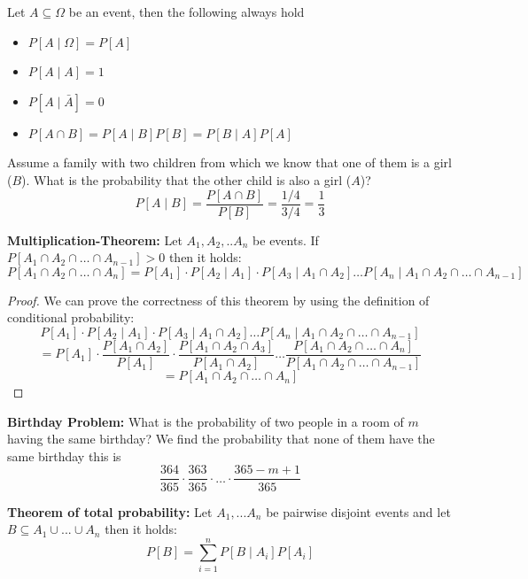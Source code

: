 \begin{remark}
    Let $A \subseteq \Omega$ be an event, then the following always hold
    \begin{itemize}
        \item $P[A \mid \Omega] = P[A]$
        \item $P[A \mid A] = 1$
        \item $P[A \mid \bar{A}] = 0$
        \item $P[A \cap B] = P[A \mid B] P[B] = P[B \mid A] P[A]$
    \end{itemize}
\end{remark}

\begin{example}
    Assume a family with two children from which we know that one of them is a girl ($B$). What is the probability that the other child is also a girl ($A$)?
    $$P[A \mid B] = \frac{P[A \cap B]}{P[B]} = \frac{1/4}{3/4} = \frac{1}{3}$$
\end{example}

\begin{theorem}
    \textbf{Multiplication-Theorem: } Let $A_1, A_2, .. A_n$ be events. If $P[A_1 \cap A_2 \cap \dots \cap A_{n-1}] > 0$ then it holds:
    $$P[A_1 \cap A_2 \cap \dots \cap A_n] = P[A_1] \cdot P[A_2 \mid A_1] \cdot P[A_3 \mid A_1 \cap A_2] \dots P[A_n \mid A_1 \cap A_2 \cap \dots \cap A_{n-1}]$$
    
\end{theorem}

\begin{proof}
    We can prove the correctness of this theorem by using the definition of conditional probability:
    $$P[A_1] \cdot P[A_2 \mid A_1] \cdot P[A_3 \mid A_1 \cap A_2] \dots P[A_n \mid A_1 \cap A_2 \cap \dots \cap A_{n-1}]$$
    $$ = P[A_1] \cdot \frac{P[A_1 \cap A_2]}{P[A_1]} \cdot \frac{P[A_1 \cap A_2 \cap A_3]}{P[A_1 \cap A_2]} \dots \frac{P[A_1 \cap A_2 \cap \dots \cap A_n]}{P[A_1 \cap A_2 \cap \dots \cap A_{n-1}]}$$
    $$ = P[A_1 \cap A_2 \cap \dots \cap A_n]$$
\end{proof}

\begin{example}
    \textbf{Birthday Problem: } What is the probability of two people in a room of $m$ having the same birthday? We find the probability that none of them have the same birthday this is 
    $$\frac{364}{365} \cdot \frac{363}{365} \cdot \dots \cdot \frac{365-m+1}{365}$$
\end{example}

\begin{theorem}
    \textbf{Theorem of total probability: }Let $A_1, ... A_n$ be pairwise disjoint events and let $B \subseteq A_1 \cup ... \cup A_n$ then it holds:
    $$P[B] = \sum_{i=1}^n P[B \mid A_i] P[A_i]$$
\end{theorem}

